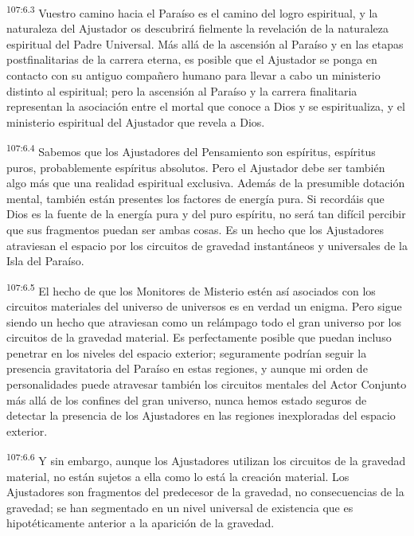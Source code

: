 \documentclass[twoside, 11pt]{book}
\begin{document}
\par
\textsuperscript{107:6.3} Vuestro camino hacia el Paraíso es el camino del logro espiritual, y la naturaleza del Ajustador os descubrirá fielmente la revelación de la naturaleza espiritual del Padre Universal. Más allá de la ascensión al Paraíso y en las etapas postfinalitarias de la carrera eterna, es posible que el Ajustador se ponga en contacto con su antiguo compañero humano para llevar a cabo un ministerio distinto al espiritual; pero la ascensión al Paraíso y la carrera finalitaria representan la asociación entre el mortal que conoce a Dios y se espiritualiza, y el ministerio espiritual del Ajustador que revela a Dios.

\par
\textsuperscript{107:6.4} Sabemos que los Ajustadores del Pensamiento son espíritus, espíritus puros, probablemente espíritus absolutos. Pero el Ajustador debe ser también algo más que una realidad espiritual exclusiva. Además de la presumible dotación mental, también están presentes los factores de energía pura. Si recordáis que Dios es la fuente de la energía pura y del puro espíritu, no será tan difícil percibir que sus fragmentos puedan ser ambas cosas. Es un hecho que los Ajustadores atraviesan el espacio por los circuitos de gravedad instantáneos y universales de la Isla del Paraíso.

\par
\textsuperscript{107:6.5} El hecho de que los Monitores de Misterio estén así asociados con los circuitos materiales del universo de universos es en verdad un enigma. Pero sigue siendo un hecho que atraviesan como un relámpago todo el gran universo por los circuitos de la gravedad material. Es perfectamente posible que puedan incluso penetrar en los niveles del espacio exterior; seguramente podrían seguir la presencia gravitatoria del Paraíso en estas regiones, y aunque mi orden de personalidades puede atravesar también los circuitos mentales del Actor Conjunto más allá de los confines del gran universo, nunca hemos estado seguros de detectar la presencia de los Ajustadores en las regiones inexploradas del espacio exterior.

\par
\textsuperscript{107:6.6} Y sin embargo, aunque los Ajustadores utilizan los circuitos de la gravedad material, no están sujetos a ella como lo está la creación material. Los Ajustadores son fragmentos del predecesor de la gravedad, no consecuencias de la gravedad; se han segmentado en un nivel universal de existencia que es hipotéticamente anterior a la aparición de la gravedad.
\end{document}
